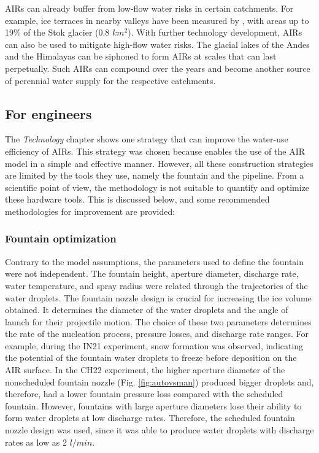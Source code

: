 \ac{AIRs} can already buffer from low-flow water risks in certain catchments. For example, ice terraces in
nearby valleys have been measured by \citet{nusserSociohydrologyArtificialGlaciers2019}, with areas up to 19\%
of the Stok glacier (0.8 $km^2$). With further technology development, \ac{AIRs} can also be used to mitigate high-flow water risks. The glacial lakes of the Andes and the Himalayas can be siphoned to form AIRs at scales that can last
perpetually. Such \ac{AIRs} can compound over the years and become another source of perennial water supply for the
respective catchments.

\subsection{For engineers}

The \textit{Technology} chapter shows one strategy that can improve the water-use efficiency of \ac{AIRs}. This strategy was chosen because enables the use of the \ac{AIR} model in a simple and effective manner. However, all these
construction strategies are limited by the tools they use, namely the fountain and the pipeline. From a scientific point of view,
the methodology is not suitable to quantify and optimize these hardware tools. This is discussed below, and some recommended methodologies for improvement are provided:

\subsubsection{Fountain optimization}

Contrary to the model assumptions, the parameters used to define the fountain were not independent. The fountain
height, aperture diameter, discharge rate, water temperature, and spray radius were related through the
trajectories of the water droplets. The fountain nozzle design is crucial for increasing the ice volume
obtained. It determines the diameter of the water droplets and the angle of launch for their projectile motion.
The choice of these two parameters determines the rate of the nucleation process, pressure losses, and discharge
rate ranges. For example, during the IN21 experiment, snow formation was observed, indicating the potential of the fountain
water droplets to freeze before deposition on the AIR surface. In the CH22 experiment, the
higher aperture diameter of the nonscheduled fountain nozzle (Fig. \ref{fig:autovsman}) produced bigger droplets
and, therefore, had a lower fountain pressure loss compared with the scheduled fountain. However, fountains
with large aperture diameters lose their ability to form water droplets at low discharge rates. Therefore, the
scheduled fountain nozzle design was used, since it was able to produce water droplets with discharge rates as
low as 2 $l/min$.

